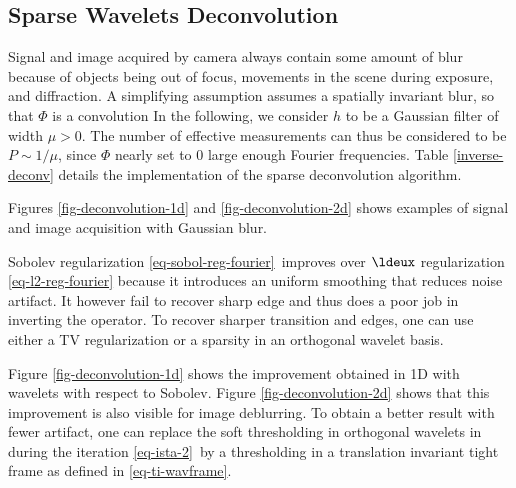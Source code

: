 

\subsection{Sparse Wavelets Deconvolution}


Signal and image acquired by camera always contain some amount of blur because of objects being out of focus, movements in the scene during exposure, and diffraction. A simplifying assumption assumes a spatially invariant blur, so that $\Phi$ is a convolution
In the following, we consider $h$ to be a Gaussian filter of width $\mu > 0$. The number of effective measurements can thus be considered to be $P \sim 1/\mu$, since $\Phi$ nearly set to 0 large enough Fourier frequencies. Table \ref{inverse-deconv} details the implementation of the sparse deconvolution algorithm.

Figures \ref{fig-deconvolution-1d} and \ref{fig-deconvolution-2d} shows examples of signal and image acquisition with Gaussian blur. 

Sobolev regularization \eqref{eq-sobol-reg-fourier} improves over $\ldeux$ regularization \eqref{eq-l2-reg-fourier} because it introduces an uniform smoothing that reduces noise artifact. It however fail to recover sharp edge and thus does a poor job in inverting the operator. To recover sharper transition and edges, one can use either a TV regularization or a sparsity in an orthogonal wavelet basis. 

Figure \ref{fig-deconvolution-1d} shows the improvement obtained in 1D with wavelets with respect to Sobolev. Figure \ref{fig-deconvolution-2d} shows that this improvement is also visible for image deblurring. To obtain a better result with fewer artifact, one can replace the soft thresholding in orthogonal wavelets in during the iteration \eqref{eq-ista-2} by a thresholding in a translation invariant tight frame as defined in \eqref{eq-ti-wavframe}.


